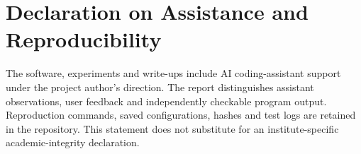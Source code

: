 \chapter*{Declaration on Assistance and Reproducibility}
The software, experiments and write-ups include AI coding-assistant support under the project author's direction. The report distinguishes assistant observations, user feedback and independently checkable program output. Reproduction commands, saved configurations, hashes and test logs are retained in the repository. This statement does not substitute for an institute-specific academic-integrity declaration.
\clearpage
